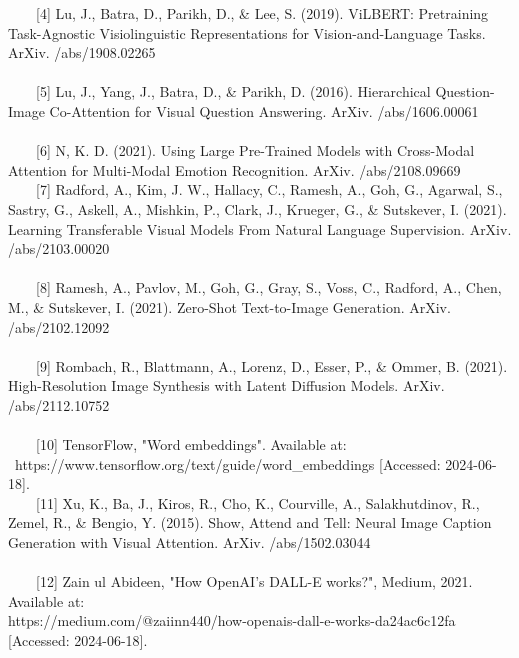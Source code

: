 \documentclass{article}
\begin{document}
$\hspace{20pt}$ [4] Lu, J., Batra, D., Parikh, D., \& Lee, S. (2019). ViLBERT: Pretraining Task-Agnostic Visiolinguistic Representations for Vision-and-Language Tasks. ArXiv. /abs/1908.02265 \\ \\

$\hspace{20pt}$ [5] Lu, J., Yang, J., Batra, D., \& Parikh, D. (2016). Hierarchical Question-Image Co-Attention for Visual Question Answering. ArXiv. /abs/1606.00061 \\ \\

$\hspace{20pt}$ [6] N, K. D. (2021). Using Large Pre-Trained Models with Cross-Modal Attention for Multi-Modal Emotion Recognition. ArXiv. /abs/2108.09669 \\

$\hspace{20pt}$ [7] Radford, A., Kim, J. W., Hallacy, C., Ramesh, A., Goh, G., Agarwal, S., Sastry, G., Askell, A., Mishkin, P., Clark, J., Krueger, G., \& Sutskever, I. (2021). Learning Transferable Visual Models From Natural Language Supervision. ArXiv. /abs/2103.00020 \\  \\

$\hspace{20pt}$ [8] Ramesh, A., Pavlov, M., Goh, G., Gray, S., Voss, C., Radford, A., Chen, M., \& Sutskever, I. (2021). Zero-Shot Text-to-Image Generation. ArXiv. /abs/2102.12092 \\ \\

$\hspace{20pt}$ [9] Rombach, R., Blattmann, A., Lorenz, D., Esser, P., \& Ommer, B. (2021). High-Resolution Image Synthesis with Latent Diffusion Models. ArXiv. /abs/2112.10752 \\ \\

$\hspace{20pt}$ [10] TensorFlow, "Word embeddings". Available at: \ https://www.tensorflow.org/text/guide/word\_embeddings [Accessed: 2024-06-18]. \\

$\hspace{20pt}$ [11] Xu, K., Ba, J., Kiros, R., Cho, K., Courville, A., Salakhutdinov, R., Zemel, R., \& Bengio, Y. (2015). Show, Attend and Tell: Neural Image Caption Generation with Visual Attention. ArXiv. /abs/1502.03044 \\ \\

$\hspace{20pt}$ [12] Zain ul Abideen, "How OpenAI’s DALL-E works?", Medium, 2021. Available at: \\https://medium.com/@zaiinn440/how-openais-dall-e-works-da24ac6c12fa [Accessed: 2024-06-18].
\end{document}
